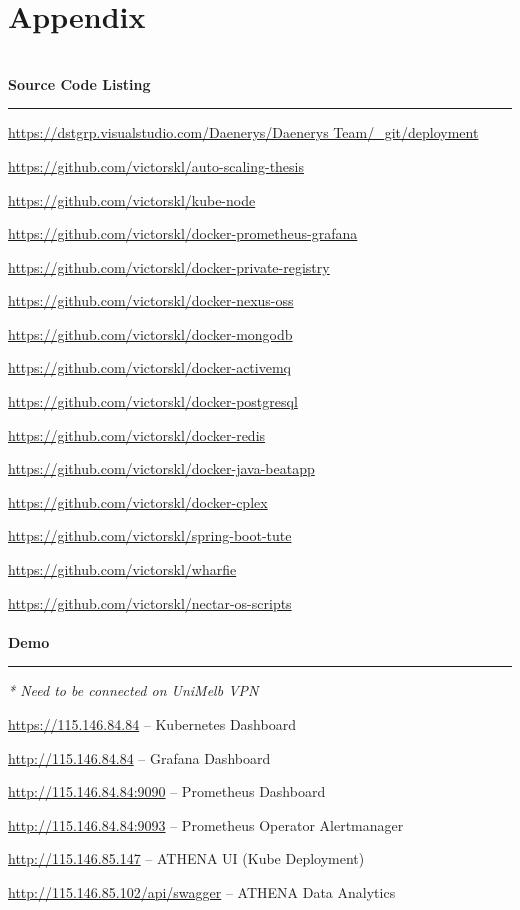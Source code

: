 
\chapter{Appendix} %

\label{AppendixA} %

\hfill
\\
\textbf{Source Code Listing}
\\
\hrule
\hfill

\url{https://dstgrp.visualstudio.com/Daenerys/Daenerys Team/_git/deployment}

\url{https://github.com/victorskl/auto-scaling-thesis}

\url{https://github.com/victorskl/kube-node}

\url{https://github.com/victorskl/docker-prometheus-grafana}

\url{https://github.com/victorskl/docker-private-registry}

\url{https://github.com/victorskl/docker-nexus-oss}

\url{https://github.com/victorskl/docker-mongodb}

\url{https://github.com/victorskl/docker-activemq}

\url{https://github.com/victorskl/docker-postgresql}

\url{https://github.com/victorskl/docker-redis}

\url{https://github.com/victorskl/docker-java-beatapp}

\url{https://github.com/victorskl/docker-cplex}

\url{https://github.com/victorskl/spring-boot-tute}

\url{https://github.com/victorskl/wharfie}

\url{https://github.com/victorskl/nectar-os-scripts}
\\
\\
\noindent \textbf{Demo}
\\
\hrule
\hfill

\textit{* Need to be connected on UniMelb VPN}
\hfill

\url{https://115.146.84.84} -- Kubernetes Dashboard

\url{http://115.146.84.84} -- Grafana Dashboard

\url{http://115.146.84.84:9090} -- Prometheus Dashboard

\url{http://115.146.84.84:9093} -- Prometheus Operator Alertmanager

\url{http://115.146.85.147} -- ATHENA UI (Kube Deployment)

\url{http://115.146.85.102/api/swagger} -- ATHENA Data Analytics







